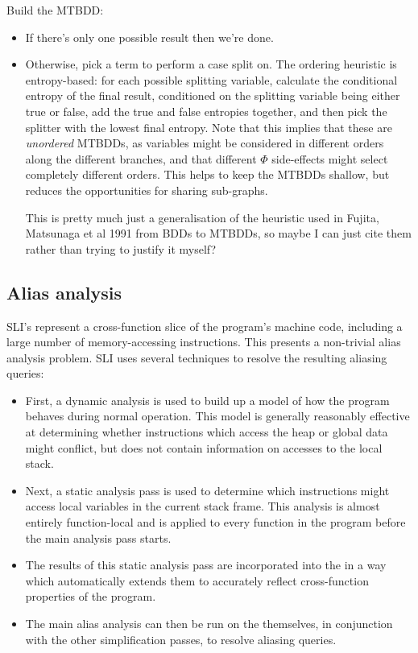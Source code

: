Build the MTBDD:

\begin{itemize}
\item
  If there's only one possible result then we're done.
\item
  Otherwise, pick a term to perform a case split on.  The ordering
  heuristic is entropy-based: for each possible splitting variable,
  calculate the conditional entropy of the final result, conditioned
  on the splitting variable being either true or false, add the true
  and false entropies together, and then pick the splitter with the
  lowest final entropy.    Note that this implies
  that these are \emph{unordered} MTBDDs, as variables might be
  considered in different orders along the different branches, and
  that different $\Phi$ side-effects might select completely different
  orders.  This helps to keep the MTBDDs shallow, but reduces the
  opportunities for sharing sub-graphs.

  This is pretty much just a generalisation of the heuristic used in
  Fujita, Matsunaga et al 1991 from BDDs to MTBDDs, so maybe I can
  just cite them rather than trying to justify it myself?
\end{itemize}
  
\subsection{Alias analysis}
\label{sect:alias_analysis}


SLI's {\StateMachines} represent a cross-function slice of the
program's machine code, including a large number of memory-accessing
instructions.  This presents a non-trivial alias analysis problem.
SLI uses several techniques to resolve the resulting aliasing queries:

\begin{itemize}
\item
  First, a dynamic analysis is used to build up a model of how the
  program behaves during normal operation.  This model is generally
  reasonably effective at determining whether instructions which
  access the heap or global data might conflict, but does not contain
  information on accesses to the local stack.
\item
  Next, a static analysis pass is used to determine which instructions
  might access local variables in the current stack frame.  This
  analysis is almost entirely function-local and is applied to every
  function in the program before the main analysis pass starts.
\item
  The results of this static analysis pass are incorporated into the
  {\StateMachines} in a way which automatically extends them to
  accurately reflect cross-function properties of the program.
\item
  The main alias analysis can then be run on the {\StateMachines}
  themselves, in conjunction with the other {\StateMachine}
  simplification passes, to resolve aliasing queries.
\end{itemize}

